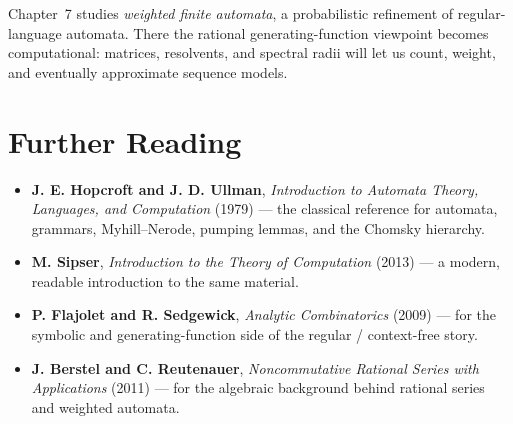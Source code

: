Chapter~7 studies \emph{weighted finite automata}, a probabilistic refinement of regular-language automata. There the rational generating-function viewpoint becomes computational: matrices, resolvents, and spectral radii will let us count, weight, and eventually approximate sequence models.

\section*{Further Reading}

\begin{itemize}
  \item \textbf{J. E. Hopcroft and J. D. Ullman}, \emph{Introduction to Automata Theory, Languages, and Computation} (1979) \cite{HopcroftUllman1979} --- the classical reference for automata, grammars, Myhill--Nerode, pumping lemmas, and the Chomsky hierarchy.
  \item \textbf{M. Sipser}, \emph{Introduction to the Theory of Computation} (2013) \cite{Sipser2013} --- a modern, readable introduction to the same material.
  \item \textbf{P. Flajolet and R. Sedgewick}, \emph{Analytic Combinatorics} (2009) \cite{FlajoletSedgewick2009} --- for the symbolic and generating-function side of the regular / context-free story.
  \item \textbf{J. Berstel and C. Reutenauer}, \emph{Noncommutative Rational Series with Applications} (2011) \cite{BerstelReutenauer2011} --- for the algebraic background behind rational series and weighted automata.
\end{itemize}
